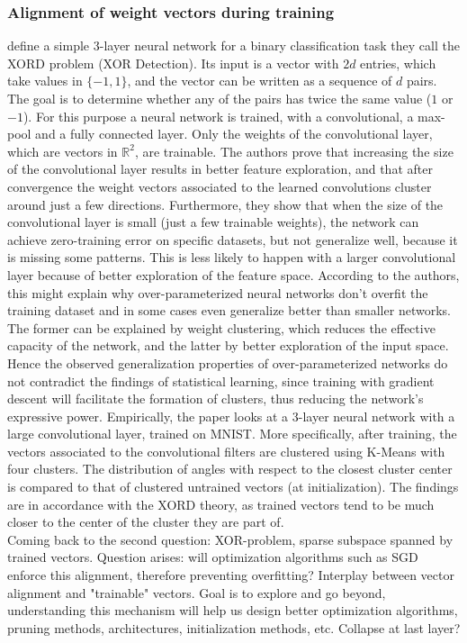 \subsubsection*{Alignment of weight vectors during training}
\cite{brutzkus2019larger} define a simple 3-layer neural network for a binary classification task they call the XORD problem (XOR Detection). Its input is a vector with $2d$ entries, which take values in $\{-1, 1\}$, and the vector can be written as a sequence of $d$ pairs. The goal is to determine whether any of the pairs has twice the same value ($1$ or $-1$). For this purpose a neural network is trained, with a convolutional, a max-pool and a fully connected layer. Only the weights of the convolutional layer, which are vectors in $\mathbb{R}^2$, are trainable. The authors prove that increasing the size of the convolutional layer results in better feature exploration, and that after convergence the weight vectors associated to the learned convolutions cluster around just a few directions. Furthermore, they show that when the size of the convolutional layer is small (just a few trainable weights), the network can achieve zero-training error on specific datasets, but not generalize well, because it is missing some patterns. This is less likely to happen with a larger convolutional layer because of better exploration of the feature space. According to the authors, this might explain why over-parameterized neural networks don't overfit the training dataset and in some cases even generalize better than smaller networks. The former can be explained by weight clustering, which reduces the effective capacity of the network, and the latter by better exploration of the input space. Hence the observed generalization properties of over-parameterized networks do not contradict the findings of statistical learning, since training with gradient descent will facilitate the formation of clusters, thus reducing the network's expressive power. Empirically, the paper looks at a 3-layer neural network with a large convolutional layer, trained on MNIST. More specifically, after training, the vectors associated to the convolutional filters are clustered using K-Means with four clusters. The distribution of angles with respect to the closest cluster center is compared to that of clustered untrained vectors (at initialization). The findings are in accordance with the XORD theory, as trained vectors tend to be much closer to the center of the cluster they are part of.\\

Coming back to the second question: XOR-problem, sparse subspace spanned by trained vectors. Question arises: will optimization algorithms such as SGD enforce this alignment, therefore preventing overfitting? Interplay between vector alignment and "trainable" vectors. Goal is to explore and go beyond, understanding this mechanism will help us design better optimization algorithms, pruning methods, architectures, initialization methods, etc. Collapse at last layer?


